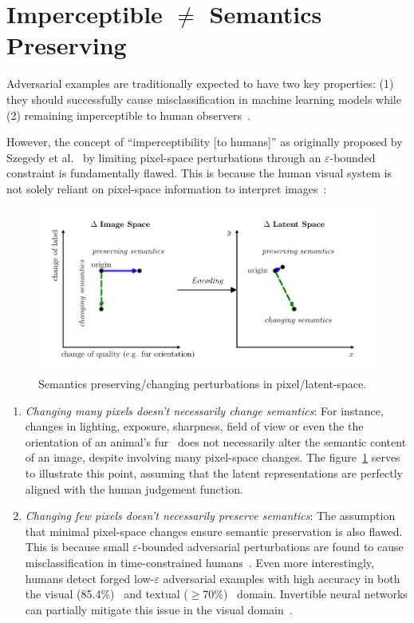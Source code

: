 \documentclass[a4paper, oneside]{discothesis}
\begin{document}
\section{Imperceptible $\not=$ Semantics Preserving}

Adversarial examples are traditionally expected to have two key properties: (1) they should successfully cause misclassification in machine learning models while (2) remaining imperceptible to human observers~\cite{cubuk2017intriguing}.

However, the concept of ``imperceptibility [to humans]'' as originally proposed by Szegedy et al.~\cite{szegedy2013intriguing} by limiting pixel-space perturbations through an $\varepsilon$-bounded constraint is fundamentally flawed. This is because the human visual system is not solely reliant on pixel-space information to interpret images~\cite{ ning2023hflic}:

\begin{figure}
    \centering
    \includegraphics[width=1\columnwidth]{figures/latentspace.pdf}
    \caption{Semantics preserving/changing perturbations in pixel/latent-space.}
    \label{fig:latentspace}
\end{figure}

\begin{enumerate}
	\item \textit{Changing many pixels doesn't necessarily change semantics}: For instance, changes in lighting, exposure, sharpness, field of view or even the the orientation of an animal's fur~\cite{kilcher2021dimpled} does not necessarily alter the semantic content of an image, despite involving many pixel-space changes. The figure~\ref{fig:latentspace} serves to illustrate this point, assuming that the latent representations are perfectly aligned with the human judgement function.

	\item \textit{Changing few pixels doesn't necessarily preserve semantics}: The assumption that minimal pixel-space changes ensure semantic preservation is also flawed. This is because small $\varepsilon$-bounded adversarial perturbations are found to cause misclassification in time-constrained humans~\cite{elsayed2018adversarial}. Even more interestingly, humans detect forged low-$\varepsilon$ adversarial examples with high accuracy in both the visual (85.4\%)~\cite{veerabadran2023subtle} and textual ($\geq$70\%)~\cite{herel2023preserving} domain. Invertible neural networks can partially mitigate this issue in the visual domain~\cite{chen2023imperceptible}.
\end{enumerate}
\end{document}
